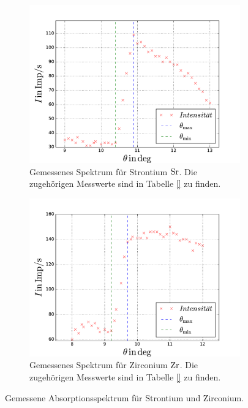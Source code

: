 \begin{figure}
  \centering
  \begin{subfigure}{0.48\textwidth}
    \centering
    \includegraphics[width=1 \textwidth]{../Messdaten/strom.pdf}
    \caption{Gemessenes Spektrum für Strontium $\ce{Sr}$. Die zugehörigen Messwerte sind in Tabelle \ref{} zu finden.}
    \label{fig: frank_hertz}
  \end{subfigure}
  \begin{subfigure}{0.48\textwidth}
    \centering
    \includegraphics[width=1 \textwidth]{../Messdaten/zr.pdf}
    \caption{Gemessenes Spektrum für Zirconium $\ce{Zr}$. Die zugehörigen Messwerte sind in Tabelle \ref{} zu finden.  } %
    \label{fig: enrgie_hot}
  \end{subfigure}
  \caption{Gemessene Absorptionsspektrum für Strontium und Zirconium.}
  \label{fig: spektrum_strontium_zirconium}
\end{figure}

